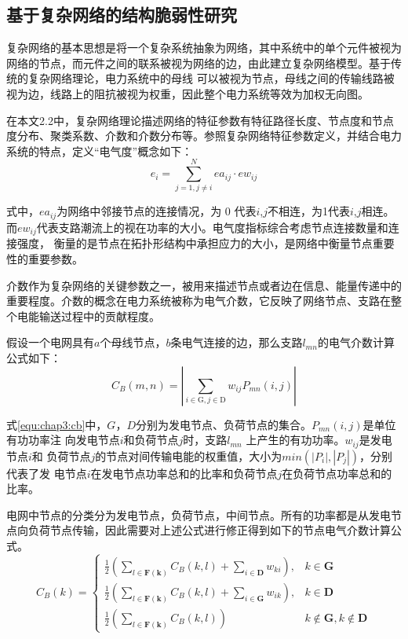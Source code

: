 \subsection{基于复杂网络的结构脆弱性研究}
\label{sec:network}

复杂网络的基本思想是将一个复杂系统抽象为网络，其中系统中的单个元件被视为网络的节点，而元件之间的联系被视为网络的边，由此建立复杂网络模型。基于传统的复杂网络理论，电力系统中的母线
可以被视为节点，母线之间的传输线路被视为边，线路上的阻抗被视为权重，因此整个电力系统等效为加权无向图\cite{refs64,refs65}。

在本文2.2中，复杂网络理论描述网络的特征参数有特征路径长度、节点度和节点度分布、聚类系数、介数和介数分布等。参照复杂网络特征参数定义，并结合电力系统的特点，定义“电气度”概念如下：
\begin{equation}
  e_{i}=\sum_{j=1, j \neq i}^{N} e a_{i j} \cdot e w_{i j}
  \end{equation}

式中，$e a_{i j}$为网络中邻接节点的连接情况，为 0 代表$i$,$j$不相连，为1代表$i$,$j$相连。而$ew_{ij}$代表支路潮流上的视在功率的大小。电气度指标综合考虑节点连接数量和连接强度，
衡量的是节点在拓扑形结构中承担应力的大小，是网络中衡量节点重要性的重要参数。

介数作为复杂网络的关键参数之一，被用来描述节点或者边在信息、能量传递中的重要程度。介数的概念在电力系统被称为电气介数，它反映了网络节点、支路在整个电能输送过程中的贡献程度\cite{refs66,refs67}。

假设一个电网具有$a$个母线节点，$b$条电气连接的边，那么支路$l_{mn}$的电气介数计算公式如下：
\begin{equation}
\label{equ:chap3:cb}
  C_{B}(m, n)=\left|\sum_{i \in \mathrm{G}, j \in \mathrm{D}} w_{i j} P_{m n}(i, j)\right|
  \end{equation}

式\ref{equ:chap3:cb}中，$G$，$D$分别为发电节点、负荷节点的集合。$P_{mn} (i, j)$是单位有功功率注
向发电节点$i$和负荷节点$j$时，支路$l_{mn}$ 上产生的有功功率。$w_{ij}$是发电节点$i$和
负荷节点$j$的节点对间传输电能的权重值，大小为$min(|P_i|,|P_j|)$，分别代表了发
电节点$i$在发电节点功率总和的比率和负荷节点$j$在负荷节点功率总和的比率。

电网中节点的分类分为发电节点，负荷节点，中间节点。所有的功率都是从发电节点向负荷节点传输，因此需要对上述公式进行修正得到如下的节点电气介数计算公式。
\begin{equation}
\label{equ:chap3:cb1}
C_{B}(k)=\left\{\begin{array}{ll}{\frac{1}{2}\left(\sum_{l \in \mathbf{F}(\mathbf{k})} C_{B}(k, l)+\sum_{i \in \mathbf{D}} w_{k i}\right),} & {k \in \mathbf{G}} \\ 
{\frac{1}{2}\left(\sum_{l \in \mathbf{F}(\mathbf{k})} C_{B}(k, l)+\sum_{i \in \mathbf{G}} w_{i k}\right),} & {k \in \mathbf{D}} \\
 {\frac{1}{2}\left(\sum_{l \in \mathbf{F}(\mathbf{k})} C_{B}(k, l)\right)} & {k \notin \mathbf{G}, k \notin \mathbf{D}}\end{array}\right.
\end{equation}

